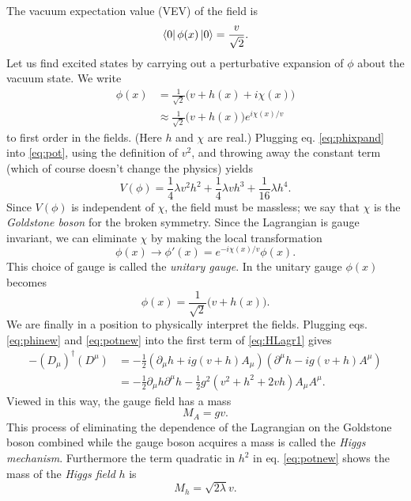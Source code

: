 The vacuum expectation value (VEV) of the field is
\begin{equation}
  \bra{0}\phi(x)\ket{0}=\frac{v}{\sqrt{2}}.
\end{equation}
Let us find excited states by carrying out a perturbative expansion of $\phi$ 
about the vacuum state. We write
\begin{equation}
  \label{eq:phixpand}
  \begin{aligned}
  \phi(x)&=\frac{1}{\sqrt{2}}\big(v+h(x)+i\chi(x)\big) \\
         &\approx\frac{1}{\sqrt{2}}\big(v+h(x)\big)
                  e^{i\chi(x)/v}
  \end{aligned}
\end{equation}
to first order in the fields. (Here $h$ and $\chi$ are real.) Plugging 
eq. \eqref{eq:phixpand} into \eqref{eq:pot}, using the definition of 
$v^2$, and throwing away the constant term (which of course doesn't change the 
physics) yields
\begin{equation}
  \label{eq:potnew}
  V(\phi)=\frac{1}{4}\lambda v^{2}h^{2}+\frac{1}{4}\lambda vh^{3}
          +\frac{1}{16}\lambda h^{4}.
\end{equation}
Since $V(\phi)$ is independent of $\chi$, the field must be massless; we say 
that $\chi$ is the {\it Goldstone boson} for the broken symmetry. Since the
Lagrangian is gauge invariant, we can eliminate $\chi$ by making the
local transformation
\begin{equation}
  \phi(x)\to\phi'(x)=e^{-i\chi(x)/v}\phi(x).
\end{equation}
This choice of gauge is called the {\it unitary gauge}. In the unitary gauge
$\phi(x)$ becomes
\begin{equation}
  \label{eq:phinew}
  \phi(x)=\frac{1}{\sqrt{2}}\big(v+h(x)\big).
\end{equation}
We are finally in a position to physically interpret the fields. Plugging 
eqs. \eqref{eq:phinew} and \eqref{eq:potnew} into the first term of 
\eqref{eq:HLagr1} gives
\begin{equation}
  \label{eq:kin}
  \begin{aligned}
    -(D_{\mu})^{\dagger}(D^{\mu})&=-\frac{1}{2}(\partial_{\mu}h+ig(v+h)A_{\mu})
                                (\partial^{\mu}h-ig(v+h)A^{\mu}) \\
         &=-\frac{1}{2}\partial_{\mu}h\partial^{\mu}h 
           -\frac{1}{2}g^{2}(v^{2}+h^{2}+2vh)A_{\mu}A^{\mu}. 
  \end{aligned}
\end{equation} 
Viewed in this way, the gauge field has a mass
\begin{equation}
  M_{A}=gv.
\end{equation}
This process of eliminating the dependence of the Lagrangian on the Goldstone
boson combined while the gauge boson acquires a mass is called the {\it Higgs
mechanism}. Furthermore the term quadratic in $h^2$ in eq. 
\eqref{eq:potnew} shows the mass of the {\it Higgs field} $h$ is
\begin{equation}
  M_{h}=\sqrt{2\lambda}v.
\end{equation}


